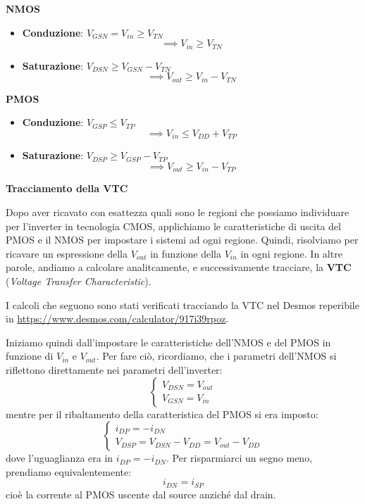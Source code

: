 \documentclass[a4paper,11pt]{article}
\begin{document}
\noindent
\begin{minipage}[t]{0.48\textwidth}
\textbf{\textsf{NMOS}}
\begin{itemize}
	\item \textbf{Conduzione}: $V_{GSN} = V_{in} \geq V_{TN}$
		$$
		\implies V_{in} \geq V_{TN}
		$$
	\item \textbf{Saturazione}: $V_{DSN} \geq V_{GSN} - V_{TN}$
		$$
		\implies V_{out} \geq V_{in} - V_{TN}
		$$
\end{itemize}

\end{minipage}\hfill
\begin{minipage}[t]{0.48\textwidth}
\textbf{\textsf{PMOS}}
\begin{itemize}
	\item \textbf{Conduzione}: $V_{GSP} \leq V_{TP}$
		$$
		\implies V_{in} \leq V_{DD} + V_{TP}
		$$
	\item \textbf{Saturazione}: $V_{DSP} \geq V_{GSP} - V_{TP}$
		$$
		\implies V_{out} \geq V_{in} - V_{TP}
		$$
\end{itemize}
\end{minipage}

\par\bigskip

\noindent
\textbf{\textsf{Tracciamento della VTC}}

\noindent
Dopo aver ricavato con esattezza quali sono le regioni che possiamo individuare per l'inverter in tecnologia CMOS, applichiamo le caratteristiche di uscita del PMOS e il NMOS per impostare i sistemi ad ogni regione. Quindi, risolviamo per ricavare un espressione della $V_{out}$ in funzione della $V_{in}$ in ogni regione. In altre parole, andiamo a calcolare analitcamente, e successivamente tracciare, la \textbf{VTC} (\textit{Voltage Transfer Characteristic}).  

I calcoli che seguono sono stati verificati tracciando la VTC nel Desmos reperibile in \url{https://www.desmos.com/calculator/917i39rpoz}.

Iniziamo quindi dall'impostare le caratteristiche dell'NMOS e del PMOS in funzione di $V_{in}$ e $V_{out}$. Per fare ciò, ricordiamo, che i parametri dell'NMOS si riflettono direttamente nei parametri dell'inverter: 
$$
\begin{cases}
V_{DSN} = V_{out} \\
V_{GSN} = V_{in}
\end{cases}
$$
mentre per il ribaltamento della caratteristica del PMOS si era imposto:
$$
\begin{cases}
i_{DP} = -i_{DN} \\
V_{DSP} = V_{DSN} - V_{DD} = V_{out} - V_{DD}
\end{cases}
$$
dove l'uguaglianza era in $i_{DP} = -i_{DN}$. Per risparmiarci un segno meno, prendiamo equivalentemente:
$$
i_{DN} = i_{SP}
$$
cioè la corrente al PMOS uscente dal source anziché dal drain.
\end{document}

